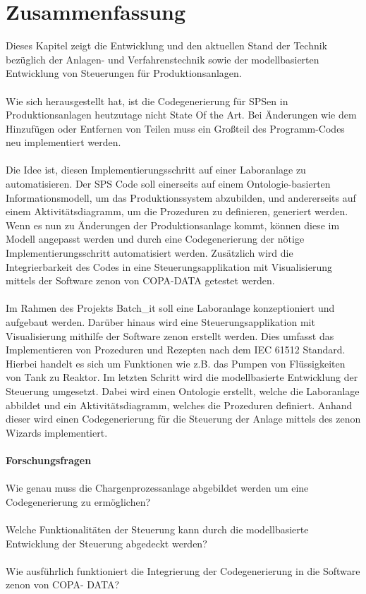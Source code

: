 \clearpage
\section{Zusammenfassung}

Dieses Kapitel zeigt die Entwicklung und den aktuellen Stand der Technik bezüglich der Anlagen- und Verfahrenstechnik sowie der modellbasierten Entwicklung von Steuerungen für Produktionsanlagen. \\\\
Wie sich herausgestellt hat, ist die Codegenerierung für SPSen in Produktionsanlagen heutzutage nicht State Of the Art. Bei Änderungen wie dem Hinzufügen oder Entfernen von Teilen muss ein Großteil des Programm-Codes neu implementiert werden. \\\\
Die Idee ist, diesen Implementierungsschritt auf einer Laboranlage zu automatisieren. Der SPS Code soll einerseits auf einem Ontologie-basierten Informationsmodell, um das Produktionssystem abzubilden, und andererseits auf einem Aktivitätsdiagramm, um die Prozeduren zu definieren, generiert werden.
Wenn es nun zu Änderungen der Produktionsanlage kommt, können diese im Modell angepasst werden und durch eine Codegenerierung der nötige Implementierungsschritt automatisiert werden. Zusätzlich wird die Integrierbarkeit des Codes in eine Steuerungsapplikation mit Visualisierung mittels der Software zenon von COPA-DATA getestet werden.\\\\
Im Rahmen des Projekts Batch\_it soll eine Laboranlage konzeptioniert und aufgebaut werden. Darüber hinaus wird eine Steuerungsapplikation mit Visualisierung mithilfe der Software zenon erstellt werden. Dies umfasst das Implementieren von Prozeduren und Rezepten nach dem IEC 61512 Standard. Hierbei handelt es sich um Funktionen wie z.B. das Pumpen von Flüssigkeiten von Tank zu Reaktor. Im letzten Schritt wird die modellbasierte Entwicklung der Steuerung umgesetzt. Dabei wird einen Ontologie erstellt, welche die Laboranlage abbildet und ein Aktivitätsdiagramm, welches die Prozeduren definiert. Anhand dieser wird einen Codegenerierung für die Steuerung der Anlage mittels des zenon Wizards implementiert.\\\\
\textbf{Forschungsfragen}\\\\
Wie genau muss die Chargenprozessanlage abgebildet werden um eine Codegenerierung zu ermöglichen? \\\\
Welche Funktionalitäten der Steuerung kann durch die modellbasierte Entwicklung der Steuerung abgedeckt werden?\\\\
Wie ausführlich funktioniert die Integrierung der Codegenerierung in die Software zenon von COPA- DATA? 